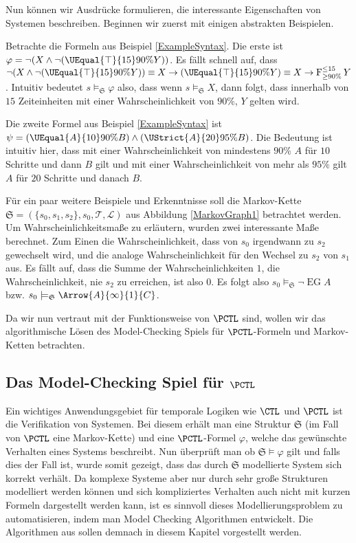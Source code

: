 Nun können wir Ausdrücke formulieren, die interessante Eigenschaften von Systemen beschreiben. Beginnen wir zuerst mit einigen abstrakten Beispielen.
\begin{example}
	\label{PCTLBeispiel}
	Betrachte die Formeln aus Beispiel \ref{ExampleSyntax}. Die erste ist $\varphi = \neg(X \land \neg(\UEqual{\top}{15}{90\%}{Y}))$.
	Es fällt schnell auf, dass $\neg(X \land \neg(\UEqual{\top}{15}{90\%}{Y})) \equiv X \rightarrow (\UEqual{\top}{15}{90\%}{Y}) \equiv X \rightarrow \operatorname{F}^{\leq 15}_{\geq 90\%}Y$.
	Intuitiv bedeutet $s\models_\mathfrak{S} \varphi$ also, dass wenn $s\models_\mathfrak{S} X$, dann folgt, dass innerhalb von $15$ Zeiteinheiten mit einer Wahrscheinlichkeit von $90\%$, $Y$ gelten wird.
	
	Die zweite Formel aus Beispiel \ref{ExampleSyntax} ist $\psi=(\UEqual{A}{10}{90\%}{B})\land(\UStrict{A}{20}{95\%}{B})$. 
	Die Bedeutung ist intuitiv hier, dass mit einer Wahrscheinlichkeit von mindestens $90\%$ $A$ für $10$ Schritte und dann $B$ gilt und mit einer Wahrscheinlichkeit von mehr als $95\%$ gilt $A$ für $20$ Schritte und danach $B$.
	
	Für ein paar weitere Beispiele und Erkenntnisse soll die Markov-Kette $\mathfrak{S}=(\{s_0, s_1,s_2\}, s_0, \mathcal{T},\mathcal{L})$ aus Abbildung \ref{MarkovGraph1} betrachtet werden.
	Um Wahrscheinlichkeitsmaße zu erläutern, wurden zwei interessante Maße berechnet. 
	Zum Einen die Wahrscheinlichkeit, dass von $s_0$ irgendwann zu $s_2$ gewechselt wird, und die analoge Wahrscheinlichkeit für den Wechsel zu $s_2$ von $s_1$ aus. 
	Es fällt auf, dass die Summe der Wahrscheinlichkeiten $1$, die Wahrscheinlichkeit, nie $s_2$ zu erreichen, ist also $0$.
	Es folgt also $s_0\models_\mathfrak{S} \neg\operatorname{EG}A$ bzw. $s_0\models_\mathfrak{S} \Arrow{A}{\infty}{1}{C}$.
\end{example}

Da wir nun vertraut mit der Funktionsweise von $\PCTL$ sind, wollen wir das algorithmische Lösen des Model-Checking Spiels für $\PCTL$-Formeln und Markov-Ketten betrachten.

\subsection{Das Model-Checking Spiel für $\PCTL$}
\label{ChapMCAlgs}

Ein wichtiges Anwendungsgebiet für temporale Logiken wie $\CTL$ und $\PCTL$ ist die Verifikation von Systemen. 
Bei diesem erhält man eine Struktur $\mathfrak{S}$ (im Fall von $\PCTL$ eine Markov-Kette) und eine $\PCTL$-Formel $\varphi$, welche das gewünschte Verhalten eines Systems beschreibt. 
Nun überprüft man ob $\mathfrak{S}\models \varphi$ gilt und falls dies der Fall ist, wurde somit gezeigt, dass das durch $\mathfrak{S}$ modellierte System sich korrekt verhält.
Da komplexe Systeme aber nur durch sehr große Strukturen modelliert werden können und sich kompliziertes Verhalten auch nicht mit kurzen Formeln dargestellt werden kann, ist es sinnvoll dieses Modellierungsproblem zu automatisieren, indem man Model Checking Algorithmen entwickelt. 
Die Algorithmen aus \cite{hansson1994logic} sollen demnach in diesem Kapitel vorgestellt werden.

